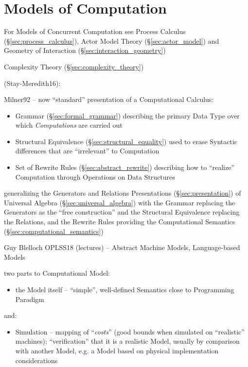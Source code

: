 \section{Models of Computation}\label{sec:computation_model}

\fist For Models of Concurrent Computation see Process Calculus
(\S\ref{sec:process_calculus}), Actor Model Theory
(\S\ref{sec:actor_model}) and Geometry of Interaction
(\S\ref{sec:interaction_geometry})

\fist Complexity Theory (\S\ref{sec:complexity_theory})

\asterism

(Stay-Meredith16):

Milner92 \cite{milner92} -- now ``standard'' presentation of a Computational
Calculus:
\begin{itemize}
  \item Grammar (\S\ref{sec:formal_grammar}) describing the primary Data Type
    over which \emph{Computations} are carried out
  \item Structural Equivalence (\S\ref{sec:structural_equality}) used to erase
    Syntactic differences that are ``irrelevant'' to Computation
  \item Set of Rewrite Rules (\S\ref{sec:abstract_rewrite}) describing how to
    ``realize'' Computation through Operations on Data Structures
\end{itemize}
generalizing the Generators and Relations Presentations
(\S\ref{sec:presentation}) of Universal Algebra (\S\ref{sec:universal_algebra})
with the Grammar replacing the Generators as the ``free construction'' and the
Structural Equivalence replacing the Relations, and the Rewrite Rules providing
the Computational Semantics (\S\ref{sec:computational_semantics})

\asterism

Guy Blelloch OPLSS18 (lectures)
--
Abstract Machine Models, Language-based Models

two parts to Computational Model:
\begin{itemize}
\item the Model itself -- ``simple'', well-defined Semantics close to
  Programming Paradigm
\end{itemize}
and:
\begin{itemize}
  \item Simulation -- mapping of ``\emph{costs}'' (good bounds when simulated on
    ``realistic'' machines); ``verification'' that it is a realistic Model,
    usually by comparison with another Model, e.g. a Model based on physical
    implementation considerations
\end{itemize}

